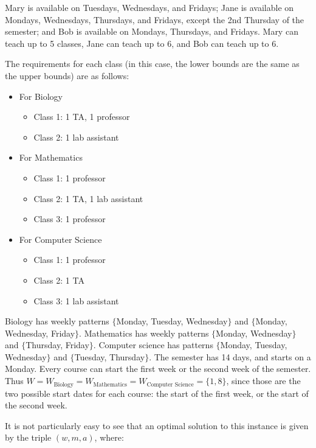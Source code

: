 Mary is available on Tuesdays, Wednesdays, and Fridays; Jane is available on Mondays, Wednesdays, Thursdays, and Fridays, except the 2nd Thursday of the semester; and Bob is available on Mondays, Thursdays, and Fridays. Mary can teach up to 5 classes, Jane can teach up to 6, and Bob can teach up to 6.

The requirements for each class (in this case, the lower bounds are the same as the upper bounds) are as follows:

\begin{itemize}
  \item For Biology
    \begin{itemize}
      \item Class 1: 1 TA, 1 professor
      \item Class 2: 1 lab assistant
    \end{itemize}
  \item For Mathematics
    \begin{itemize}
      \item Class 1: 1 professor
      \item Class 2: 1 TA, 1 lab assistant
      \item Class 3: 1 professor
    \end{itemize}
  \item For Computer Science
    \begin{itemize}
      \item Class 1: 1 professor
      \item Class 2: 1 TA
      \item Class 3: 1 lab assistant
    \end{itemize}
\end{itemize}

Biology has weekly patterns $\{$Monday, Tuesday, Wednesday$\}$ and $\{$Monday, Wednesday, Friday$\}$. Mathematics has weekly patterns $\{$Monday, Wednesday$\}$ and $\{$Thursday, Friday$\}$. Computer science has patterns $\{$Monday, Tuesday, Wednesday$\}$ and $\{$Tuesday, Thursday$\}$. The semester has 14 days, and starts on a Monday. Every course can start the first week or the second week of the semester. Thus $W = W_{\text{Biology}} = W_{\text{Mathematics}} = W_{\text{Computer Science}} = \{1, 8\}$, since those are the two possible start dates for each course: the start of the first week, or the start of the second week.


It is not particularly easy to see that an optimal solution to this instance is given by the triple $(w, m, a)$, where:

